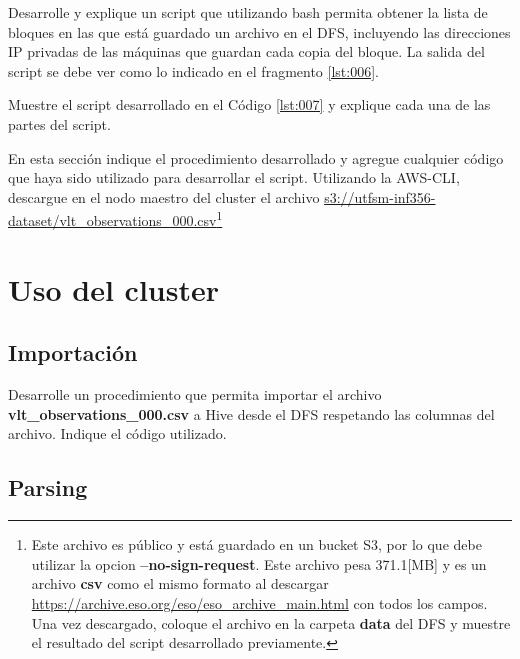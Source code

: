 \documentclass[12pt,letterpaper,twoside]{article}
\begin{document}
{\color{red} Desarrolle y explique un script que utilizando bash permita obtener la lista de bloques en las que está guardado un archivo en el DFS, incluyendo las direcciones IP privadas de las máquinas que guardan cada copia del bloque. La salida del script se debe ver como lo indicado en el fragmento \ref{lst:006}.}

\begin{code}[H]

\end{code}

{\color{red} Muestre el script desarrollado en el Código \ref{lst:007} y explique cada una de las partes del script.}

\begin{code}[H]
    
    \end{code}

{\color{red} En esta sección indique el procedimiento desarrollado y agregue cualquier código que haya sido utilizado para desarrollar el script.}
{\color{red} Utilizando la AWS-CLI, descargue en el nodo maestro del cluster el archivo \url{s3://utfsm-inf356-dataset/vlt_observations_000.csv}}\footnote{Este archivo es público y está guardado en un bucket S3, por lo que debe utilizar la opcion \textbf{--no-sign-request}. Este archivo pesa 371.1[MB] y es un archivo \textbf{csv} como el mismo formato al descargar \url{https://archive.eso.org/eso/eso_archive_main.html} con todos los campos. Una vez descargado, coloque el archivo en la carpeta \textbf{data} del DFS y muestre el resultado del script desarrollado previamente.}

\section{Uso del cluster}

\subsection{Importación}

{\color{red} Desarrolle un procedimiento que permita importar el archivo \textbf{vlt\_observations\_000.csv} a Hive desde el DFS respetando las columnas del archivo. Indique el código utilizado.}

\subsection{Parsing}
\end{document}
